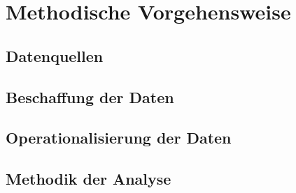 \section{Methodische Vorgehensweise}
\subsection{Datenquellen}
\subsection{Beschaffung der Daten}
\subsection{Operationalisierung der Daten}
\subsection{Methodik der Analyse}